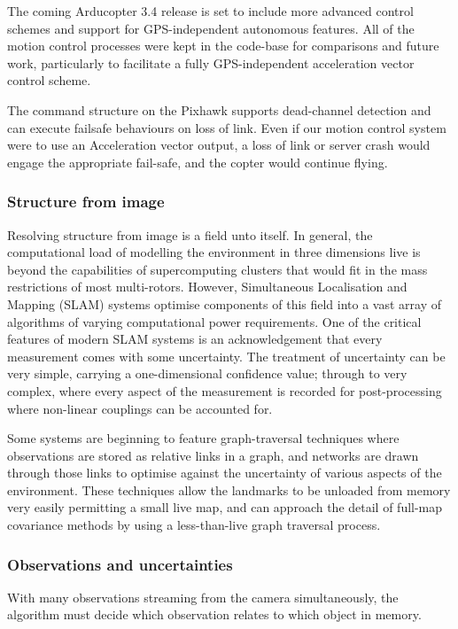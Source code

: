 \documentclass{article}
\newcounter{subsubsubsection}[subsubsection]
\begin{document}
      The coming Arducopter 3.4 release is set to include more advanced control schemes and support for GPS-independent autonomous features.  All of the motion control processes were kept in the code-base for comparisons and future work, particularly to facilitate a fully GPS-independent acceleration vector control scheme.

      The command structure on the Pixhawk supports dead-channel detection and can execute failsafe behaviours on loss of link.  Even if our motion control system were to use an Acceleration vector output, a loss of link or server crash would engage the appropriate fail-safe, and the copter would continue flying.

    \subsubsection{Structure from image}
      Resolving structure from image is a field unto itself.  In general, the computational load of modelling the environment in three dimensions live is beyond the capabilities of supercomputing clusters that would fit in the mass restrictions of most multi-rotors.  However, Simultaneous Localisation and Mapping (SLAM) systems optimise components of this field into a vast array of algorithms of varying computational power requirements.
      One of the critical features of modern SLAM systems is an acknowledgement that every measurement comes with some uncertainty. 
      The treatment of uncertainty can be very simple, carrying a one-dimensional confidence value; through to very complex, where every aspect of the measurement is recorded for post-processing where non-linear couplings can be accounted for.

      Some systems are beginning to feature graph-traversal techniques where observations are stored as relative links in a graph, and networks are drawn through those links to optimise against the uncertainty of various aspects of the environment.  These techniques allow the landmarks to be unloaded from memory very easily permitting a small live map, and can approach the detail of full-map covariance methods by using a less-than-live graph traversal process.

    \subsubsection{Observations and uncertainties}

        \label{sec:objectAllocation}
        With many observations streaming from the camera simultaneously, the algorithm must decide which observation relates to which object in memory.
\end{document}
